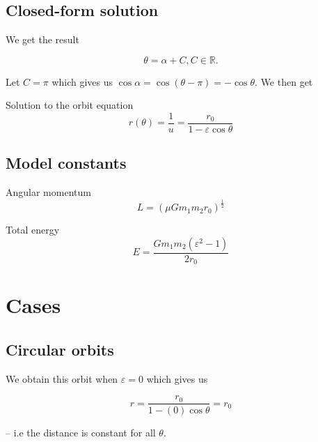\subsection{Closed-form solution}

\begin{frame}{\subsecname}

We get the result

\begin{equation}
\theta = \alpha + C, C \in \mathbb{R}.
\end{equation}

Let \(C = \pi \) which gives us \( \cos \alpha = \cos(\theta - \pi) = -\cos \theta \). We then get

\begin{block}{Solution to the orbit equation}
\begin{equation}
r(\theta) = \frac{1}{u} = \frac{r_0}{1 - \varepsilon \cos \theta}
\end{equation}

\end{block}

\end{frame}

\subsection{Model constants}

\begin{frame}{\subsecname}

\begin{block}{Angular momentum}
    \begin{equation}
        L = \left( \mu G m_1m_2r_0\right)^{\frac{1}{2}}
    \end{equation}
\end{block}
\begin{block}{Total energy}
    \begin{equation}
       E = \frac{Gm_1m_2(\varepsilon^2-1)}{2r_0} \label{tot_e}
    \end{equation}
\end{block}
\end{frame}

\section{Cases}

\subsection{Circular orbits}
\begin{frame}{\subsecname}

We obtain this orbit when \(\varepsilon = 0\) which gives us

\begin{equation}
    r = \frac{r_0}{1- (0)\cos \theta} = r_0
\end{equation}

-- i.e the distance is constant for all \(\theta\).

\end{frame}

